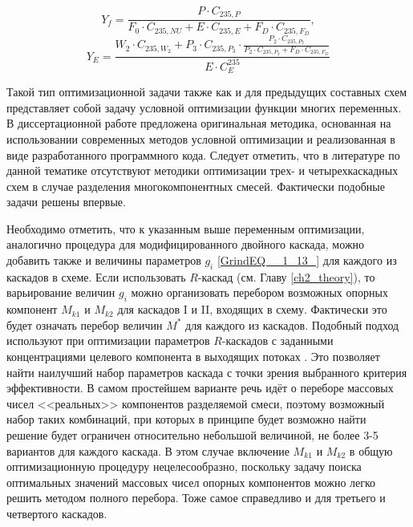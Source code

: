 \begin{equation} \label{Rec3} 
    Y_{f} = \frac{P \cdot C_{235,P}}{F_0 \cdot C_{235,NU} + E \cdot C_{235,E} + F_D \cdot C_{235,F_D}},
\end{equation} 
\begin{equation} \label{RecR3} 
    Y_{E} = \frac{W_2\cdot C_{235,W_2} + P_3\cdot C_{235,P_3}\cdot \frac{P_2\cdot C_{235,P_2}}{P_2\cdot C_{235,P_2}+ F_D \cdot C_{235,F_D}}}{E \cdot C_{E}^{235}}        
\end{equation} 

Такой тип оптимизационной задачи также как и для предыдущих составных схем представляет собой задачу условной оптимизации функции многих переменных. В диссертационной работе предложена оригинальная методика, основанная на использовании современных методов условной оптимизации и реализованная в виде разработанного программного кода.
Следует отметить, что в литературе по данной тематике отсутствуют методики оптимизации трех- и четырехкаскадных схем в случае разделения многокомпонентных смесей. Фактически подобные задачи решены впервые.

Необходимо отметить, что к указанным выше переменным оптимизации, аналогично процедура для модифицированного двойного каскада, можно добавить также и величины параметров $g_{i}$ \ref{GrindEQ__1_13_} для каждого из каскадов в схеме. Если использовать $R$-каскад (см. Главу \ref{ch2_theory}), то варьирование величин $g_{i}$ можно организовать перебором возможных опорных компонент $M_{k1}$ и $M_{k2}$ для каскадов I и II, входящих в схему. Фактически это будет означать перебор величин $M^{*}$ для каждого из каскадов. Подобный подход используют при оптимизации параметров $R$-каскадов с заданными концентрациями целевого компонента в выходящих потоках \cite{songComparativeStudyModel2010, sulaberidzeSravnenieOptimalnyhModelnyh2008}. Это позволяет найти наилучший набор параметров каскада с точки зрения выбранного критерия эффективности. В самом простейшем варианте речь идёт о переборе массовых чисел <<реальных>> компонентов разделяемой смеси, поэтому возможный набор таких комбинаций, при которых в принципе будет возможно найти решение будет ограничен относительно небольшой величиной, не более 3-5 вариантов для каждого каскада. В этом случае включение $M_{k1}$ и $M_{k2}$ в общую оптимизационную процедуру нецелесообразно, поскольку задачу поиска оптимальных значений массовых чисел опорных компонентов можно легко решить методом полного перебора. Тоже самое справедливо и для третьего и четвертого каскадов.



